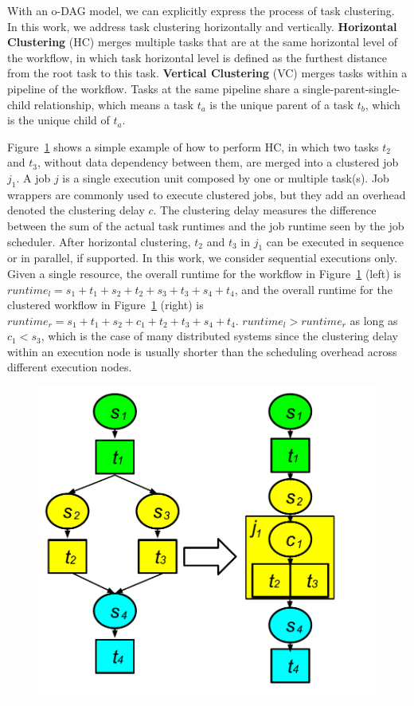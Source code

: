 With an o-DAG model, we can explicitly express the process of task clustering. In this work, we address task clustering horizontally and vertically. \textbf{Horizontal Clustering} (HC) merges multiple tasks that are at the same horizontal level of the workflow, in which task horizontal level is defined as the furthest distance from the root task to this task. \textbf{Vertical Clustering} (VC) merges tasks within a pipeline of the workflow. Tasks at the same pipeline share a single-parent-single-child relationship, which means a task $t_a$ is the unique parent of a task $t_b$, which is the unique child of $t_a$. 

Figure~\ref{fig:model_hc} shows a simple example of how to perform HC, in which two tasks $t_2$ and $t_3$, without data dependency between them, are merged into a clustered job $j_1$. A job $j$ is a single execution unit composed by one or multiple task(s). Job wrappers are commonly used to execute clustered jobs, but they add an overhead denoted the clustering delay $c$. The clustering delay measures the difference between the sum of the actual task runtimes and the job runtime seen by the job scheduler. 
After horizontal clustering, $t_2$ and $t_3$ in $j_1$ can be executed in sequence or in parallel, if supported. In this work, we consider sequential executions only. Given a single resource, the overall runtime for the workflow in Figure~\ref{fig:model_hc} (left) is $runtime_l=s_1+t_1+s_2+t_2+s_3+t_3+s_4+t_4$, and the overall runtime for the clustered workflow in Figure~\ref{fig:model_hc} (right) is $runtime_r=s_1+t_1+s_2+c_1+t_2+t_3+s_4+t_4$.  $runtime_l > runtime_r$ as long as $c_1 < s_3$, which is the case of many distributed systems since the clustering delay within an execution node is usually shorter than the scheduling overhead across different execution nodes. 

\begin{figure}[htb]
\centering
 \includegraphics[width=0.65\linewidth]{figures/model/hc_color.pdf}
  \label{fig:model_hc}
\end{figure}


